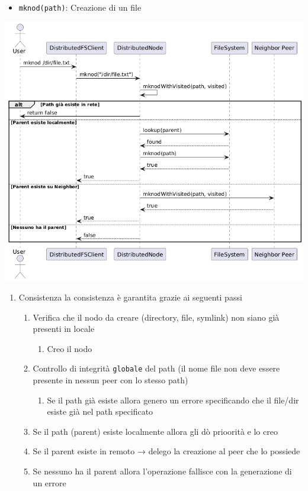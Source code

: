\documentclass[11pt]{article}
\begin{document}
\begin{itemize}
\item \texttt{mknod(path)}: Creazione di un  file
\end{itemize}
\begin{center}
\includegraphics[width=.9\linewidth]{./img/mknod.png}
\end{center}
\begin{enumerate}
\item Consistenza
\label{sec:orge706d97}
la consistenza è garantita grazie ai seguenti passi
\begin{enumerate}
\item Verifica che il nodo da creare (directory, file, symlink) non siano già presenti in locale
\begin{enumerate}
\item Creo il nodo
\end{enumerate}
\item Controllo di integrità \texttt{globale} del path (il nome file non deve essere presente in nessun peer con lo stesso path)
\begin{enumerate}
\item Se il path già esiste allora genero un errore specificando che il file/dir esiste già nel path specificato
\end{enumerate}
\item Se il path (parent) esiste localmente allora gli dò prioorità e lo creo
\item Se il parent esiste in remoto → delego la creazione al peer che lo possiede
\item Se nessuno ha il parent allora l'operazione fallisce con la generazione di un errore
\end{enumerate}
\end{enumerate}
\end{document}
